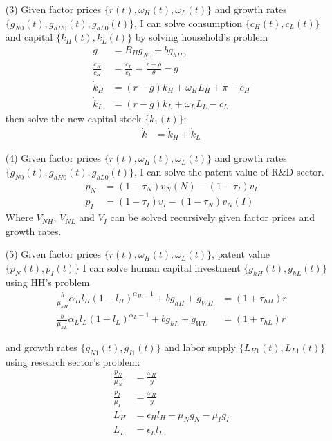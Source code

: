 \documentclass[12pt]{article}
\begin{document}
\begin{appendices}
\begin{itemize}
\item[(3)] Given factor prices $\{r(t),\omega_H(t),\omega_L(t)\}$ and growth rates $\{g_{N0}(t),g_{hH0}(t),g_{hL0}(t)\}$, I can solve consumption $\{c_H(t),c_L(t)\}$ and capital $\{k_H(t),k_L(t)\}$ by solving household's problem
\begin{align*}
g &= B_Hg_{N0}+bg_{hH0} \\
\frac{\dot{c}_H}{c_H} &= \frac{\dot{c}_L}{c_L} = \frac{r-\rho}{\theta}-g \\
\dot{k}_H &= (r-g)k_H+\omega_HL_H+\pi-c_H \\
\dot{k}_L &=  (r-g)k_L+\omega_L L_L-c_L
\end{align*}
then solve the new capital stock $\{k_1(t)\}$:
\begin{align*}
\dot{k} &= \dot{k}_H+ \dot{k}_L
\end{align*}

\item[(4)] Given factor prices $\{r(t),\omega_H(t),\omega_L(t)\}$ and growth rates $\{g_{N0}(t),g_{hH0}(t),g_{hL0}(t)\}$, I can solve the patent value of R\&D sector. 
\begin{align*}
p_N &= (1-\tau_N)v_N(N)-(1-\tau_I)v_I\\
p_I &= (1-\tau_I)v_I-(1-\tau_N)v_N(I) 
\end{align*}
Where $V_{NH}$, $V_{NL}$ and $V_I$ can be solved recursively given factor prices and growth rates. 


\item[(5)] Given factor prices $\{r(t),\omega_H(t),\omega_L(t)\}$, patent value $\{p_N(t),p_I(t)\}$ I can solve human capital investment $\{g_{hH}(t), g_{hL}(t)\}$ using HH's problem
\begin{align*}
\frac{b}{\mu_{hH}}\alpha_Hl_H(1-l_H)^{\alpha_H-1}+bg_{hH}+g_{WH} &= (1+\tau_{hH})r\\
\frac{b}{\mu_{hL}}\alpha_Ll_L(1-l_L)^{\alpha_L-1}+bg_{hL}+g_{WL} &= (1+\tau_{hL})r
\end{align*}

and growth rates $\{g_{N1}(t), g_{I1}(t)\}$ and labor supply $\{L_{H1}(t), L_{L1}(t)\}$ using research sector's problem: 
\begin{align*}
\frac{p_N}{\mu_N} &= \frac{\omega_H}{y}  \\
\frac{p_I}{\mu_I} &= \frac{\omega_H}{y}  \\
L_H &=\epsilon_H l_H-\mu_Ng_N-\mu_Ig_I \\
L_L &=\epsilon_L l_L
\end{align*}


\end{itemize}
\end{appendices}
\end{document}
